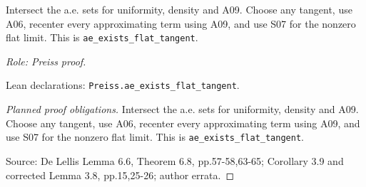 \begin{theorem}
\label{thm:part-a}







Intersect the a.e. sets for uniformity, density and A09. Choose any tangent,
use A06, recenter every approximating term using A09, and use S07 for the
nonzero flat limit. This is \texttt{ae\_exists\_flat\_tangent}.
\par\emph{Role: Preiss proof.}
\par Lean declarations: \texttt{Preiss.ae\_exists\_flat\_tangent}.
\end{theorem}
\begin{proof}[Planned proof obligations]

Intersect the a.e. sets for uniformity, density and A09. Choose any tangent,
use A06, recenter every approximating term using A09, and use S07 for the
nonzero flat limit. This is \texttt{ae\_exists\_flat\_tangent}.
\par Source: De Lellis Lemma 6.6, Theorem 6.8, pp.57-58,63-65; Corollary 3.9 and corrected Lemma 3.8, pp.15,25-26; author errata.
\end{proof}


